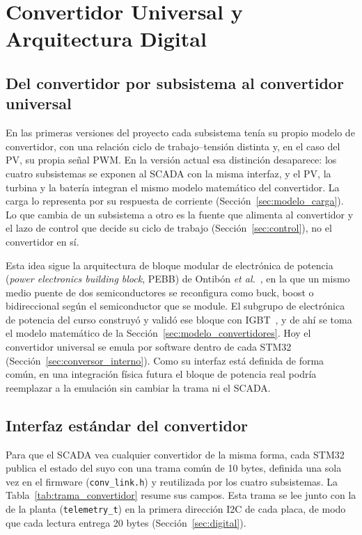 \documentclass[conference]{IEEEtran}
\begin{document}
\section{Convertidor Universal y Arquitectura Digital}
\label{app:conv}
\label{sec:convertidor_universal}

\subsection{Del convertidor por subsistema al convertidor universal}

En las primeras versiones del proyecto cada subsistema tenía su propio modelo de convertidor, con una relación ciclo de trabajo--tensión distinta y, en el caso del PV, su propia señal PWM. En la versión actual esa distinción desaparece: los cuatro subsistemas se exponen al SCADA con la misma interfaz, y el PV, la turbina y la batería integran el mismo modelo matemático del convertidor. La carga lo representa por su respuesta de corriente (Sección~\ref{sec:modelo_carga}). Lo que cambia de un subsistema a otro es la fuente que alimenta al convertidor y el lazo de control que decide su ciclo de trabajo (Sección~\ref{sec:control}), no el convertidor en sí.

Esta idea sigue la arquitectura de bloque modular de electrónica de potencia (\emph{power electronics building block}, PEBB) de Ontibón \emph{et al.}~\cite{ontibon2025pebb}, en la que un mismo medio puente de dos semiconductores se reconfigura como buck, boost o bidireccional según el semiconductor que se module. El subgrupo de electrónica de potencia del curso construyó y validó ese bloque con IGBT~\cite{pinto2026peb}, y de ahí se toma el modelo matemático de la Sección~\ref{sec:modelo_convertidores}. Hoy el convertidor universal se emula por software dentro de cada STM32 (Sección~\ref{sec:conversor_interno}). Como su interfaz está definida de forma común, en una integración física futura el bloque de potencia real podría reemplazar a la emulación sin cambiar la trama ni el SCADA.

\subsection{Interfaz estándar del convertidor}
\label{sec:interfaz_convertidor}

Para que el SCADA vea cualquier convertidor de la misma forma, cada STM32 publica el estado del suyo con una trama común de 10 bytes, definida una sola vez en el firmware (\texttt{conv\_link.h}) y reutilizada por los cuatro subsistemas. La Tabla~\ref{tab:trama_convertidor} resume sus campos. Esta trama se lee junto con la de la planta (\texttt{telemetry\_t}) en la primera dirección I2C de cada placa, de modo que cada lectura entrega 20 bytes (Sección~\ref{sec:digital}).
\end{document}
